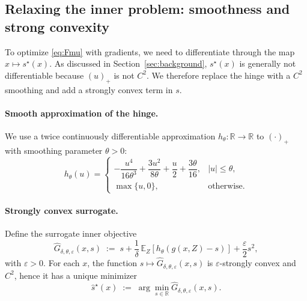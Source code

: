 \documentclass{uai2026} %
\theoremstyle{plain}
\theoremstyle{definition}
\begin{document}
\subsection{Relaxing the inner problem: smoothness and strong convexity}\label{sec:inner-relax}
To optimize \eqref{eq:Fmu} with gradients, we need to differentiate through the map $x\mapsto s^\star(x)$.
As discussed in Section~\ref{sec:background}, $s^\star(x)$ is generally not differentiable because $(u)_+$ is not $C^2$.
We therefore replace the hinge with a $C^2$ smoothing and add a strongly convex term in $s$.

\paragraph{Smooth approximation of the hinge.}
We use a twice continuously differentiable approximation $h_\theta:\mathbb{R}\to\mathbb{R}$ to $(\cdot)_+$ with smoothing parameter $\theta>0$:
\begin{equation}
  h_\theta(u)=
  \begin{cases}
    -\dfrac{u^4}{16\theta^3} + \dfrac{3u^2}{8\theta} + \dfrac{u}{2} + \dfrac{3\theta}{16}, & |u|\le \theta,\\[6pt]
    \max\{u,0\}, & \text{otherwise.}
  \end{cases}\label{eq:htheta}
\end{equation}

\paragraph{Strongly convex surrogate.}
Define the surrogate inner objective
\begin{equation}
  \widehat G_{\delta,\theta,\varepsilon}(x,s)
  \;:=\;
  s + \frac{1}{\delta}\,\mathbb{E}_Z\!\left[h_\theta\!\left(g(x,Z)-s\right)\right]
  + \frac{\varepsilon}{2}s^2,\label{eq:Ghat}
\end{equation}
with $\varepsilon>0$.
For each $x$, the function $s\mapsto \widehat G_{\delta,\theta,\varepsilon}(x,s)$ is $\varepsilon$-strongly convex and $C^2$, hence it has a unique minimizer
\begin{equation}
  \widehat s^\star(x)\;:=\;\arg\min_{s\in\mathbb{R}} \widehat G_{\delta,\theta,\varepsilon}(x,s).\label{eq:shat-star}
\end{equation}
\end{document}

